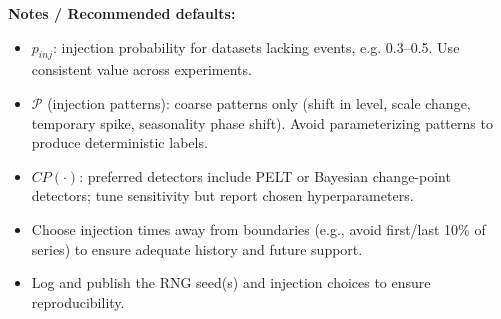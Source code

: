 \vspace{6pt}
\noindent\textbf{Notes / Recommended defaults:}
\begin{itemize}
  \item $p_{inj}$: injection probability for datasets lacking events, e.g. 0.3--0.5. Use consistent value across experiments.
  \item $\mathcal{P}$ (injection patterns): coarse patterns only (shift in level, scale change, temporary spike, seasonality phase shift). Avoid parameterizing patterns to produce deterministic labels.
  \item $CP(\cdot)$: preferred detectors include PELT or Bayesian change-point detectors; tune sensitivity but report chosen hyperparameters.
  \item Choose injection times away from boundaries (e.g., avoid first/last 10\% of series) to ensure adequate history and future support.
  \item Log and publish the RNG seed(s) and injection choices to ensure reproducibility.
\end{itemize}

\bigskip


